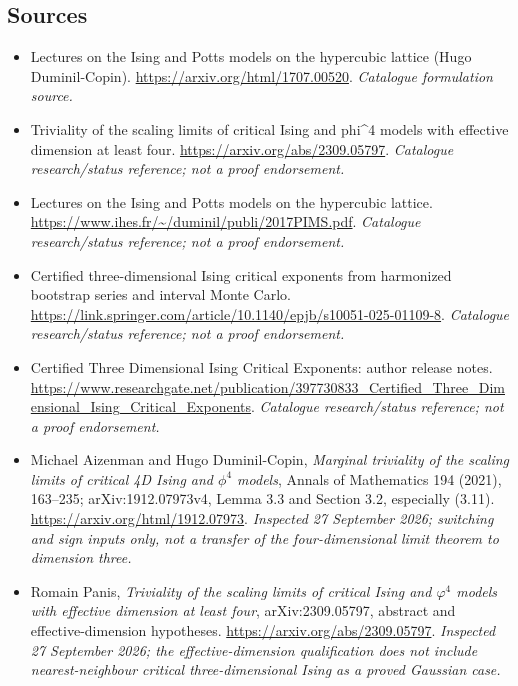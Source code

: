 \documentclass[11pt,a4paper]{article}
\numberwithin{equation}{section}
\begin{document}
\subsection{Sources}
\begin{itemize}\raggedright
\item[\textnormal{[S1]}]\hypertarget{source:statement:1}{} Lectures on the Ising and Potts models on the hypercubic lattice (Hugo Duminil-Copin).
\url{https://arxiv.org/html/1707.00520}.
{\small\textit{Catalogue formulation source.}}
\item[\textnormal{[S2]}]\hypertarget{source:statement:2}{} Triviality of the scaling limits of critical Ising and phi\textasciicircum{}4 models with effective dimension at least four.
\url{https://arxiv.org/abs/2309.05797}.
{\small\textit{Catalogue research/status reference; not a proof endorsement.}}
\item[\textnormal{[S3]}]\hypertarget{source:statement:3}{} Lectures on the Ising and Potts models on the hypercubic lattice.
\url{https://www.ihes.fr/~/duminil/publi/2017PIMS.pdf}.
{\small\textit{Catalogue research/status reference; not a proof endorsement.}}
\item[\textnormal{[S4]}]\hypertarget{source:statement:4}{} Certified three-dimensional Ising critical exponents from harmonized bootstrap series and interval Monte Carlo.
\url{https://link.springer.com/article/10.1140/epjb/s10051-025-01109-8}.
{\small\textit{Catalogue research/status reference; not a proof endorsement.}}
\item[\textnormal{[S5]}]\hypertarget{source:statement:5}{} Certified Three Dimensional Ising Critical Exponents: author release notes.
\url{https://www.researchgate.net/publication/397730833_Certified_Three_Dimensional_Ising_Critical_Exponents}.
{\small\textit{Catalogue research/status reference; not a proof endorsement.}}
\item[\textnormal{[E1]}]\hypertarget{extra:statement:1}{} Michael Aizenman and
Hugo Duminil-Copin, \emph{Marginal triviality of the scaling limits of
critical 4D Ising and $\phi^4$ models}, Annals of Mathematics 194 (2021),
163--235; arXiv:1912.07973v4, Lemma 3.3 and Section 3.2, especially (3.11).
\url{https://arxiv.org/html/1912.07973}.
{\small\textit{Inspected 27 September 2026; switching and sign inputs only,
not a transfer of the four-dimensional limit theorem to dimension three.}}
\item[\textnormal{[E2]}]\hypertarget{extra:statement:2}{} Romain Panis,
\emph{Triviality of the scaling limits of critical Ising and $\varphi^4$
models with effective dimension at least four}, arXiv:2309.05797,
abstract and effective-dimension hypotheses.
\url{https://arxiv.org/abs/2309.05797}.
{\small\textit{Inspected 27 September 2026; the effective-dimension
qualification does not include nearest-neighbour critical three-dimensional
Ising as a proved Gaussian case.}}
\end{itemize}
\end{document}
